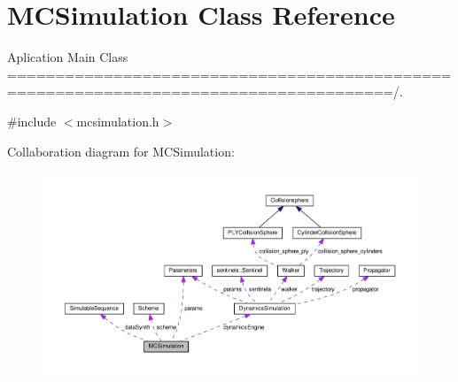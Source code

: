 \hypertarget{class_m_c_simulation}{}\section{M\+C\+Simulation Class Reference}
\label{class_m_c_simulation}


Aplication Main Class ======================================================================================/.  




{\ttfamily \#include $<$mcsimulation.\+h$>$}



Collaboration diagram for M\+C\+Simulation\+:\nopagebreak
\begin{figure}[H]
\begin{center}
\leavevmode
\includegraphics[width=350pt]{class_m_c_simulation__coll__graph}
\end{center}
\end{figure}
